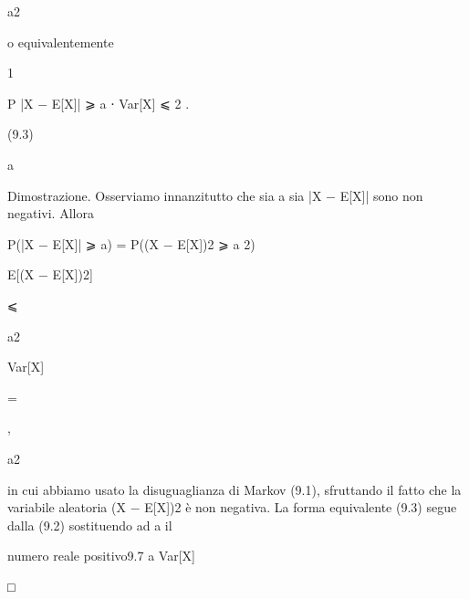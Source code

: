 \documentclass[a4paper,portrait,12pt]{article}
\begin{document}
\begin{flushleft}
a2
\end{flushleft}


\begin{flushleft}
o equivalentemente
\end{flushleft}


1


\begin{flushleft}
P |X $-$ E[X]| ⩾ a ⋅ Var[X] ⩽ 2 .
\end{flushleft}


(9.3)


\begin{flushleft}
a
\end{flushleft}


\begin{flushleft}
Dimostrazione. Osserviamo innanzitutto che sia a sia |X $-$ E[X]| sono non negativi. Allora
\end{flushleft}


\begin{flushleft}
P(|X $-$ E[X]| ⩾ a) = P((X $-$ E[X])2 ⩾ a 2)
\end{flushleft}


\begin{flushleft}
E[(X $-$ E[X])2]
\end{flushleft}


⩽


\begin{flushleft}
a2
\end{flushleft}


\begin{flushleft}
Var[X]
\end{flushleft}


=


,


\begin{flushleft}
a2
\end{flushleft}


\begin{flushleft}
in cui abbiamo usato la disuguaglianza di Markov (9.1), sfruttando il fatto che la variabile aleatoria (X $-$ E[X])2 \`{e} non negativa. La forma equivalente (9.3) segue dalla (9.2) sostituendo ad a il
\end{flushleft}


\begin{flushleft}
numero reale positivo9.7 a Var[X]
\end{flushleft}


□
\end{document}
